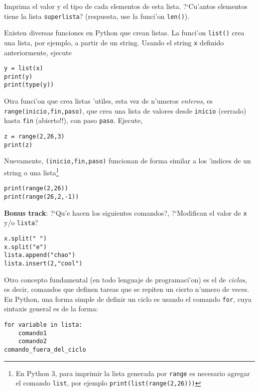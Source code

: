 \documentclass[11pt]{exam}
\begin{document}
\begin{questions}
Imprima el valor y el tipo de cada elementos de esta lista. ?`Cu'antos elementos tiene la lista \texttt{superlista}? (respuesta, use la funci'on \texttt{len()}).

\item Existen diversas funciones en Python que crean listas. La funci'on \texttt{list()} crea una lista, por ejemplo, a partir de un string. Usando el string \texttt{x} definido anteriormente, ejecute

\begin{verbatim}
y = list(x)
print(y)
print(type(y))
\end{verbatim}

\item Otra funci'on que crea listas 'utiles, esta vez de n'umeros \textit{enteros}, es \texttt{range(inicio,fin,paso)}, que crea una lista de valores desde \texttt{inicio} (cerrado) hasta \texttt{fin} (abierto!!), con paso \texttt{paso}. Ejecute,

\begin{verbatim}
z = range(2,26,3)
print(z)
\end{verbatim}

Nuevamente, \texttt{(inicio,fin,paso)} funcionan de forma similar a los 'indices de un string o una lista\footnote{En Python 3, para imprimir la lista generada por \texttt{range} es necesario agregar el comando \texttt{list}, por ejemplo \texttt{print(list(range(2,26)))}}

\begin{verbatim}
print(range(2,26))
print(range(26,2,-1))
\end{verbatim}

\textbf{Bonus track}: 
?`Qu'e hacen los siguientes comandos?, ?`Modifican el valor de \texttt{x} y/o \texttt{lista}?

\begin{verbatim}
x.split(" ")
x.split("e")
lista.append("chao")
lista.insert(2,"cool")
\end{verbatim}

\item Otro concepto fundamental (en todo lenguaje de programaci'on) es el de \textit{ciclos}, es decir, comandos que definen tareas que se repiten un cierto n'umero de veces. En Python, una forma simple de definir un ciclo es usando el comando \texttt{for}, cuya sintaxis general es de la forma:
\begin{verbatim}
for variable in lista:
	comando1
	comando2
comando_fuera_del_ciclo
\end{verbatim}


\end{questions}
\end{document}

